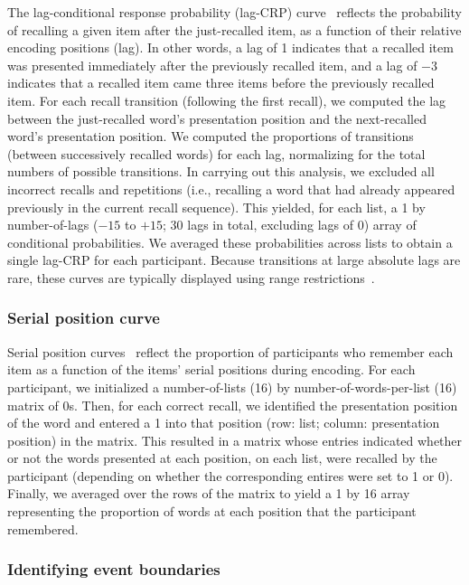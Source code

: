 \documentclass[11pt]{article}
\begin{document}
The lag-conditional response probability (lag-CRP) curve~\citep{Kaha96}
reflects the probability of recalling a given item after the just-recalled
item, as a function of their relative encoding positions (lag). In other words,
a lag of 1 indicates that a recalled item was presented immediately after the
previously recalled item, and a lag of $-3$ indicates that a recalled item came
three items before the previously recalled item. For each recall transition
(following the first recall), we computed the lag between the just-recalled
word's presentation position and the next-recalled word's presentation
position. We computed the proportions of transitions (between successively
recalled words) for each lag, normalizing for the total numbers of possible
transitions. In carrying out this analysis, we excluded all incorrect recalls
and repetitions (i.e., recalling a word that had already appeared previously in
the current recall sequence). This yielded, for each list, a 1 by
number-of-lags ($-15$ to $+15$; 30 lags in total, excluding lags of 0) array of
conditional probabilities. We averaged these probabilities across lists to
obtain a single lag-CRP for each participant. Because transitions at large
absolute lags are rare, these curves are typically displayed using range
restrictions~\citep{Kaha12}.



\subsubsection*{Serial position curve}

Serial position curves~\citep{Murd62a} reflect the proportion of participants
who remember each item as a function of the items' serial positions during
encoding. For each participant, we initialized a number-of-lists (16) by
number-of-words-per-list (16) matrix of 0s. Then, for each correct recall, we
identified the presentation position of the word and entered a 1 into that
position (row: list; column: presentation position) in the matrix. This
resulted in a matrix whose entries indicated whether or not the words presented
at each position, on each list, were recalled by the participant (depending on
whether the corresponding entires were set to 1 or 0). Finally, we averaged
over the rows of the matrix to yield a 1 by 16 array representing the
proportion of words at each position that the participant remembered.

\subsubsection*{Identifying event boundaries}
\end{document}
